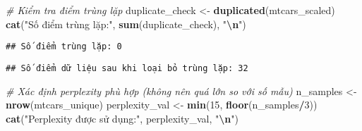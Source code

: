 \documentclass[
]{article}
\newenvironment{Shaded}{\begin{snugshade}}{\end{snugshade}}
\newcommand{\CommentTok}[1]{\textcolor[rgb]{0.56,0.35,0.01}{\textit{#1}}}
\newcommand{\DecValTok}[1]{\textcolor[rgb]{0.00,0.00,0.81}{#1}}
\newcommand{\FunctionTok}[1]{\textcolor[rgb]{0.13,0.29,0.53}{\textbf{#1}}}
\newcommand{\NormalTok}[1]{#1}
\newcommand{\OtherTok}[1]{\textcolor[rgb]{0.56,0.35,0.01}{#1}}
\newcommand{\SpecialCharTok}[1]{\textcolor[rgb]{0.81,0.36,0.00}{\textbf{#1}}}
\newcommand{\StringTok}[1]{\textcolor[rgb]{0.31,0.60,0.02}{#1}}
\begin{document}
\begin{Shaded}
\begin{Highlighting}[]
\CommentTok{\# Kiểm tra điểm trùng lặp}
\NormalTok{duplicate\_check }\OtherTok{\textless{}{-}} \FunctionTok{duplicated}\NormalTok{(mtcars\_scaled)}
\FunctionTok{cat}\NormalTok{(}\StringTok{"Số điểm trùng lặp:"}\NormalTok{, }\FunctionTok{sum}\NormalTok{(duplicate\_check), }\StringTok{"}\SpecialCharTok{\textbackslash{}n}\StringTok{"}\NormalTok{)}
\end{Highlighting}
\end{Shaded}

\begin{verbatim}
## Số điểm trùng lặp: 0
\end{verbatim}

\begin{Shaded}
\end{Shaded}

\begin{verbatim}
## Số điểm dữ liệu sau khi loại bỏ trùng lặp: 32
\end{verbatim}

\begin{Shaded}
\begin{Highlighting}[]
\CommentTok{\# Xác định perplexity phù hợp (không nên quá lớn so với số mẫu)}
\NormalTok{n\_samples }\OtherTok{\textless{}{-}} \FunctionTok{nrow}\NormalTok{(mtcars\_unique)}
\NormalTok{perplexity\_val }\OtherTok{\textless{}{-}} \FunctionTok{min}\NormalTok{(}\DecValTok{15}\NormalTok{, }\FunctionTok{floor}\NormalTok{(n\_samples}\SpecialCharTok{/}\DecValTok{3}\NormalTok{))}
\FunctionTok{cat}\NormalTok{(}\StringTok{"Perplexity được sử dụng:"}\NormalTok{, perplexity\_val, }\StringTok{"}\SpecialCharTok{\textbackslash{}n}\StringTok{"}\NormalTok{)}
\end{Highlighting}
\end{Shaded}
\end{document}
